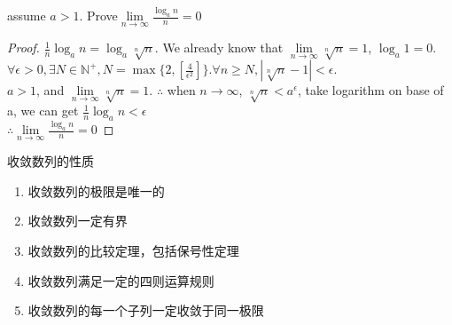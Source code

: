 \begin{qs}
	assume $ a>1 $. Prove$ \lim\limits_{n\rightarrow\infty}\frac{\log_a n}{n} = 0 $
\end{qs}
\begin{proof}
	$\frac{1}{n}\log_a n = \log_a \sqrt[n]{n}$. We already know that $  \lim\limits_{n\rightarrow\infty}\sqrt[n]{n} = 1 $, $ \log_a 1 = 0 $.\\
	$\forall \epsilon >0, \exists N \in \mathbb{N}^+, N = \max\{2,[\frac{4}{\epsilon^2}]\}. \forall n \geqslant N, |\sqrt[n]{n}-1| < \epsilon$.\\
	\color{red}$ a>1 $, and $ \lim\limits_{n\rightarrow\infty}\sqrt[n]{n} = 1 $. $ \therefore  $ when $ n\rightarrow \infty $, $ \sqrt[n]{n}<a^\epsilon $, take logarithm on base of a, we can get $ \frac{1}{n}\log_a {n}<\epsilon $ 	\\
	\color{black}
	$ \therefore \lim\limits_{n\rightarrow\infty} \frac{\log_a n}{n} = 0 $
\end{proof}

\date{2021.5.6}
收敛数列的性质
\begin{enumerate}
	\item 收敛数列的极限是唯一的
	\item 收敛数列一定有界
	\item 收敛数列的比较定理，包括保号性定理
	\item 收敛数列满足一定的四则运算规则
	\item 收敛数列的每一个子列一定收敛于同一极限
\end{enumerate}

